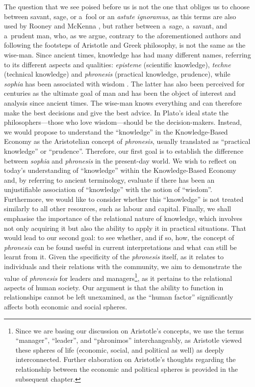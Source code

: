 The question that we see poised before us is not the one that obliges us to choose between savant, sage, or a~fool or an \textit{astute ignoramus}, as this terms are also used by Rooney and McKenna 
\parencite*[][p.315]{rooney_should_2005}, %
 but rather between a~sage, a~savant, and a~prudent man, who, as we argue, contrary to the aforementioned authors and following the footsteps of Aristotle and Greek philosophy, is not the same as the wise-man. Since ancient times, knowledge has had many different names, referring to its different aspects and qualities: \textit{episteme} (scientific knowledge), \textit{techne} (technical knowledge) and \textit{phronesis} (practical knowledge, prudence), while \textit{sophia} has been associated with wisdom 
\parencite[][]{rackham_nicomachean_1934}. %
 The latter has also been perceived for centuries as the ultimate goal of man and has been the object of interest and analysis since ancient times. The wise-man knows everything and can therefore make the best decisions and give the best advice. In Plato's ideal state the philosophers---those who love wisdom---should be the decision-makers. Instead, we would propose to understand the ``knowledge'' in the Knowledge-Based Economy as the Aristotelian concept of \textit{phronesis}, usually translated as ``practical knowledge'' or ``prudence''. Therefore, our first goal is to establish the difference between \textit{sophia} and \textit{phronesis} in the present-day world. We wish to reflect on today's understanding of ``knowledge'' within the Knowledge-Based Economy and, by referring to ancient terminology, evaluate if there has been an unjustifiable association of ``knowledge'' with the notion of ``wisdom''. Furthermore, we would like to consider whether this ``knowledge'' is not treated similarly to all other resources, such as labour and capital. Finally, we shall emphasise the importance of the relational nature of knowledge, which involves not only acquiring it but also the ability to apply it in practical situations. That would lead to our second goal: to see whether, and if so, how, the concept of \textit{phronesis} can be found useful in current interpretations and what can still be learnt from it. Given the specificity of the \textit{phronesis} itself, as it relates to individuals and their relations with the community, we aim to demonstrate the value of \textit{phronesis} for leaders and managers\footnote{Since we are basing our discussion on Aristotle's concepts, we use the terms ``manager'', ``leader'', and ``phronimos'' interchangeably, as Aristotle viewed these spheres of life (economic, social, and political as well) as deeply interconnected. Further elaboration on Aristotle's thoughts regarding the relationship between the economic and political spheres is provided in the subsequent chapter.}, as it pertains to the relational aspects of human society. Our argument is that the ability to function in relationships cannot be left unexamined, as the ``human factor'' significantly affects both economic and social spheres.



